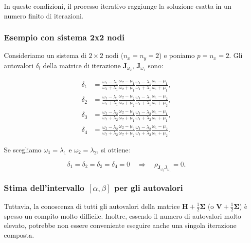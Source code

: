 In queste condizioni, il processo iterativo raggiunge la soluzione esatta in un numero finito di iterazioni.



\subsubsection{Esempio con sistema 2x2 nodi}

Consideriamo un sistema di \(2 \times 2\) nodi (\(n_x = n_y = 2\)) e poniamo \(p = n_x = 2\). Gli autovalori \(\delta_i\) della matrice di iterazione \(\mathbf{J}_{\omega_2},\, \mathbf{J}_{\omega_1}\) sono:

\[
\begin{aligned}
	\delta_1 &= \frac{\omega_2 - \lambda_1}{\omega_2 + \lambda_1} \frac{\omega_2 - \mu_1}{\omega_2 + \mu_1} \frac{\omega_1 - \lambda_1}{\omega_1 + \lambda_1} \frac{\omega_1 - \mu_1}{\omega_1 + \mu_1}, \\
	\delta_2 &= \frac{\omega_2 - \lambda_1}{\omega_2 + \lambda_1} \frac{\omega_2 - \mu_2}{\omega_2 + \mu_2} \frac{\omega_1 - \lambda_1}{\omega_1 + \lambda_1} \frac{\omega_1 - \mu_2}{\omega_1 + \mu_2}, \\
	\delta_3 &= \frac{\omega_2 - \lambda_2}{\omega_2 + \lambda_2} \frac{\omega_2 - \mu_1}{\omega_2 + \mu_1} \frac{\omega_1 - \lambda_2}{\omega_1 + \lambda_2} \frac{\omega_1 - \mu_1}{\omega_1 + \mu_1}, \\
	\delta_4 &= \frac{\omega_2 - \lambda_2}{\omega_2 + \lambda_2} \frac{\omega_2 - \mu_2}{\omega_2 + \mu_2} \frac{\omega_1 - \lambda_2}{\omega_1 + \lambda_2} \frac{\omega_1 - \mu_2}{\omega_1 + \mu_2}.
\end{aligned}
\]

Se scegliamo \(\omega_1 = \lambda_1\) e \(\omega_2 = \lambda_2\), si ottiene:

\[
\delta_1 = \delta_2 = \delta_3 = \delta_4 = 0 \quad \Rightarrow \quad \rho_{\mathbf{J}_{\omega_2} \mathbf{J}_{\omega_1}} = 0.
\]


\subsubsection{Stima dell'intervallo \([\alpha, \beta]\) per gli autovalori}

Tuttavia, la conoscenza di tutti gli autovalori della matrice \(\mathbf{H} + \frac{1}{2}\mathbf \Sigma\) (o \(\mathbf{V} + \frac{1}{2}\mathbf\Sigma\)) è spesso un compito molto difficile.
Inoltre, essendo il numero di autovalori molto elevato, potrebbe non essere conveniente eseguire anche una singola iterazione composta.


